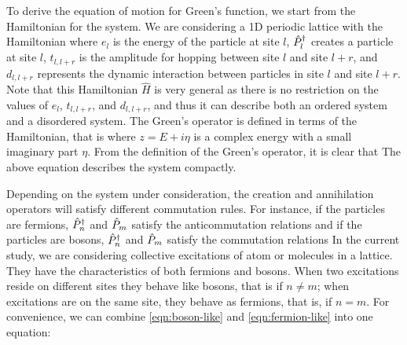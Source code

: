 To derive the equation of motion for Green's function, we start from the Hamiltonian for the system. We are 
considering a 1D periodic lattice with the Hamiltonian
where $e_l$ is the energy of the particle at site $l$, $\hat{P}^{\dagger}_{l}$ creates a particle at site $l$, $t_{l, l+r}$ is the amplitude 
for hopping  between
site $l$ and site $l+r$, and $d_{l, l+r}$ represents the dynamic interaction between particles in 
site $l$ and site $l+r$. Note that this Hamiltonian $\hat{H}$ is very general as there is no restriction on the values 
of $e_l$, $t_{l, l+r}$, and $d_{l, l+r}$, and thus it can describe both an ordered system and a 
disordered system. The Green's operator is defined in terms of the Hamiltonian, that is
where $z = E + i\eta$ is a complex energy with a small imaginary part $\eta$. From the definition of the Green's operator, it is clear that  
The above equation  describes the system compactly. 

Depending on the system under consideration, the creation and annihilation operators will satisfy different commutation
rules. For instance, if the particles are fermions, $\hat{P}^{\dagger}_{n}$ and $\hat{P}_{m}$ satisfy the anticommutation relations
and if the particles are bosons, $\hat{P}^{\dagger}_{n}$ and $\hat{P}_{m}$ satisfy the commutation relations
In the current study, we are considering collective excitations of atom or molecules in a lattice. They have the 
characteristics of both fermions and bosons. When two excitations reside on different sites they behave like
bosons, that is
if $n \neq m$; when excitations are on the same site, they behave as fermions, that is,
if $n = m$. For convenience, we can combine \autoref{eqn:boson-like} and \autoref{eqn:fermion-like} into one equation:

